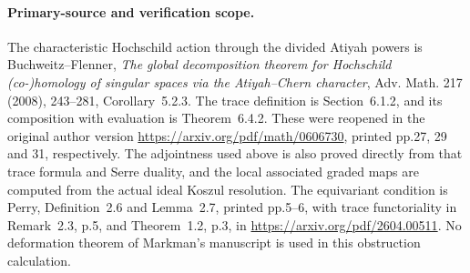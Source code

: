 \paragraph{Primary-source and verification scope.}
The characteristic Hochschild action through the divided Atiyah
powers is Buchweitz--Flenner, \emph{The global decomposition
theorem for Hochschild (co-)homology of singular spaces via the
Atiyah--Chern character}, Adv. Math. 217 (2008), 243--281,
Corollary~5.2.3. The trace definition is Section~6.1.2, and its
composition with evaluation is Theorem~6.4.2. These were reopened
in the original author version \url{https://arxiv.org/pdf/math/0606730},
printed pp.27, 29 and 31, respectively. The adjointness used
above is also proved directly from that trace formula and Serre
duality, and the local associated graded maps are computed from
the actual ideal Koszul resolution.
The equivariant condition is Perry, Definition~2.6 and
Lemma~2.7, printed pp.5--6, with trace functoriality in
Remark~2.3, p.5, and Theorem~1.2, p.3, in
\url{https://arxiv.org/pdf/2604.00511}. No deformation theorem
of Markman's manuscript is used in this obstruction calculation.
